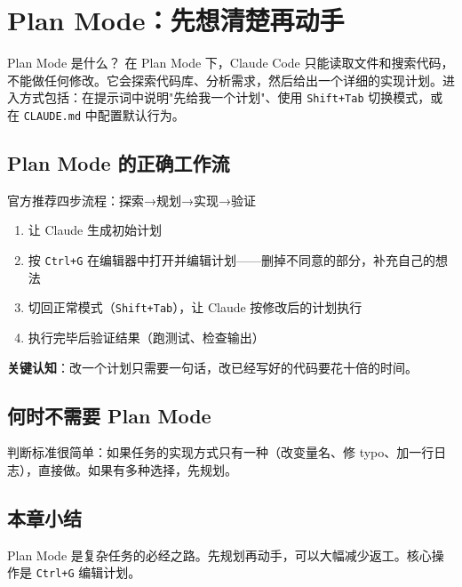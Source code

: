 \section{Plan Mode：先想清楚再动手}

\begin{knowledgebox}{Plan Mode 是什么？}
在 Plan Mode 下，Claude Code 只能读取文件和搜索代码，不能做任何修改。它会探索代码库、分析需求，然后给出一个详细的实现计划。进入方式包括：在提示词中说明"先给我一个计划"、使用 \texttt{Shift+Tab} 切换模式，或在 \texttt{CLAUDE.md} 中配置默认行为。
\end{knowledgebox}

\subsection{Plan Mode 的正确工作流}

\begin{importantbox}{官方推荐四步流程：探索→规划→实现→验证}
\begin{enumerate}[leftmargin=1.5em]
  \item 让 Claude 生成初始计划
  \item 按 \texttt{Ctrl+G} 在编辑器中打开并编辑计划——删掉不同意的部分，补充自己的想法
  \item 切回正常模式（\texttt{Shift+Tab}），让 Claude 按修改后的计划执行
  \item 执行完毕后验证结果（跑测试、检查输出）
\end{enumerate}
\textbf{关键认知}：改一个计划只需要一句话，改已经写好的代码要花十倍的时间。
\end{importantbox}

\subsection{何时不需要 Plan Mode}

判断标准很简单：如果任务的实现方式只有一种（改变量名、修 typo、加一行日志），直接做。如果有多种选择，先规划。

\subsection{本章小结}

Plan Mode 是复杂任务的必经之路。先规划再动手，可以大幅减少返工。核心操作是 \texttt{Ctrl+G} 编辑计划。

